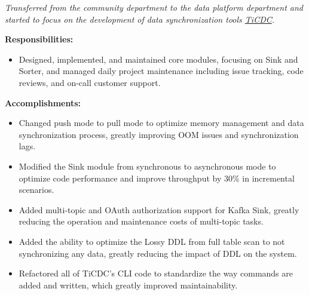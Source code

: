 \documentclass{software_engineer_poe_liu}
\newcommand{\en}[1]{#1}
\newcommand{\zh}[1]{}
\begin{document}
\en{}
\zh{\datedsubsection{\textbf{\href{https://pingcap.com/zh/}{PingCAP Inc. - 数据库 - 数据库工具研发（Golang/Rust）}}}{2021/07 -- 2023/07}}
\en{\textsl{Transferred from the community department to the data platform department and started to focus on the development of data synchronization tools {\href{https://github.com/pingcap/tiflow}{TiCDC}}.}}
\zh{\textsl{从社区部门转组到数据平台部门，开始专注于数据同步工具 {\href{https://github.com/pingcap/tiflow}{TiCDC} 的研发。}}}

\en{\textbf{Responsibilities:}}
\zh{\textbf{职责：}}
\begin{itemize}
      \item \en{Designed, implemented, and maintained core modules, focusing on Sink and Sorter, and managed daily project maintenance including issue tracking, code reviews, and on-call customer support.}
            \zh{设计、实现和维护核心模块，专注于 Sink 和 Sorter，管理项目日常维护，包括 issue 追踪、代码审阅和 on-call 客户支持。}
\end{itemize}

\en{\textbf{Accomplishments:}}
\zh{\textbf{产出：}}
\begin{itemize}
      \item \en{Changed push mode to pull mode to optimize memory management and data synchronization process, greatly improving OOM issues and synchronization lags.}
            \zh{将推送模式修改为了拉取模式优化了内存管理和数据同步流程，极大的改善了 OOM 问题和同步延迟。}
      \item \en{Modified the Sink module from synchronous to asynchronous mode to optimize code performance and improve throughput by 30\% in incremental scenarios.}
            \zh{将 Sink 模块从同步模式修改为异步模式，优化代码性能，将增量场景下吞吐提升 30\%。}
      \item \en{ Added multi-topic and OAuth authorization support for Kafka Sink, greatly reducing the operation and maintenance costs of multi-topic tasks.}
            \zh{为 Kafka Sink 支持了多 Topic 和 OAuth 授权功能，极大的降低了多 Topic 的任务运维成本。}
      \item \en{Added the ability to optimize the Lossy DDL from full table scan to not synchronizing any data, greatly reducing the impact of DDL on the system.}
            \zh{将有损 DDL 从全表扫描优化为不同步任何数据，极大的降低了有损 DDL 对系统的影响。}
      \item \en{Refactored all of TiCDC's CLI code to standardize the way commands are added and written, which greatly improved maintainability.}
            \zh{重构了 TiCDC 的 CLI 所有代码，标准化了命令添加和编写方式，极大提升了可维护性。}
\end{itemize}
\end{document}
